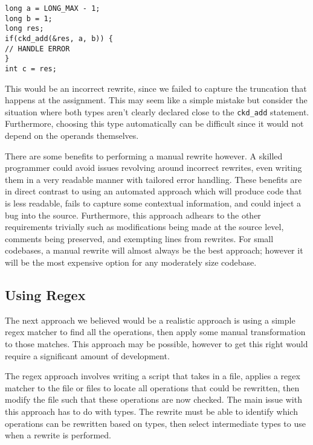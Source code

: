 \begin{flushleft}
\begin{minipage}{\linewidth}
\texttt{long a = LONG\_MAX - 1;\\
long b = 1;\\
long res;\\
if(ckd\_add(&res, a, b)) \{\\
// HANDLE ERROR\\
\}\\
int c = res;
}
\end{minipage}
\end{flushleft}

This would be an incorrect rewrite, since we failed to capture the truncation that happens at the assignment. This may seem like a simple mistake but consider the situation where both types aren't clearly declared close to the \texttt{ckd\_add} statement. Furthermore, choosing this type automatically can be difficult since it would not depend on the operands themselves.

There are some benefits to performing a manual rewrite however. A skilled programmer could avoid issues revolving around incorrect rewrites, even writing them in a very readable manner with tailored error handling. These benefits are in direct contrast to using an automated approach which will produce code that is less readable, fails to capture some contextual information, and could inject a bug into the source. Furthermore, this approach adhears to the other requirements trivially such as modifications being made at the source level, comments being preserved, and exempting lines from rewrites. For small codebases, a manual rewrite will almost always be the best approach; however it will be the most expensive option for any moderately size codebase. 

\subsection{Using Regex}

The next approach we believed would be a realistic approach is using a simple regex matcher to find all the operations, then apply some manual transformation to those matches. This approach may be possible, however to get this right would require a significant amount of development.

The regex approach involves writing a script that takes in a file, applies a regex matcher to the file or files to locate all operations that could be rewritten, then modify the file such that these operations are now checked. The main issue with this approach has to do with types. The rewrite must be able to identify which operations can be rewritten based on types, then select intermediate types to use when a rewrite is performed.

